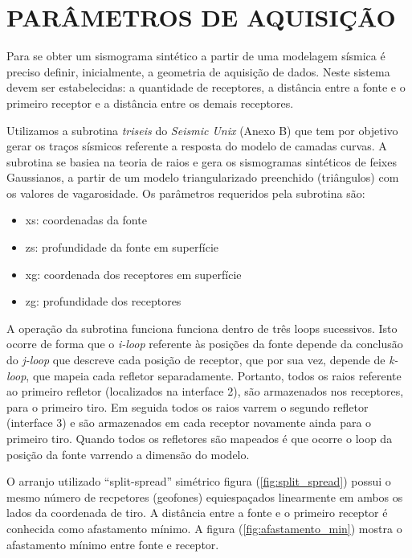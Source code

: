 \section{PARÂMETROS DE AQUISIÇÃO}

Para se obter um sismograma sintético a partir de uma modelagem sísmica é preciso definir, inicialmente, a geometria de aquisição de dados. Neste sistema devem ser estabelecidas: a quantidade de receptores, a distância entre a fonte e o primeiro receptor e a distância entre os demais receptores.

Utilizamos a subrotina \textit{triseis} do \textit{Seismic Unix} (Anexo B) que tem por objetivo gerar os traços sísmicos referente a resposta do modelo de camadas curvas. A subrotina se basiea na teoria de raios e gera os sismogramas sintéticos de feixes Gaussianos, a partir de um modelo triangularizado preenchido (triângulos) com os valores de vagarosidade. Os parâmetros requeridos pela subrotina são:

\begin{itemize}
 \item xs: coordenadas da fonte
 \item zs: profundidade da fonte em superfície
 \item xg: coordenada dos receptores em superfície
 \item zg: profundidade dos receptores
\end{itemize}

A operação da subrotina funciona funciona dentro de três loops sucessivos. Isto ocorre de forma que o \textit{i-loop} referente às posições da fonte depende da conclusão do \textit{j-loop} que descreve cada posição de receptor, que por sua vez, depende de \textit{k-loop}, que mapeia cada refletor separadamente. Portanto, todos os raios referente ao primeiro refletor (localizados na interface 2), são armazenados nos receptores, para o primeiro tiro. Em seguida todos os raios varrem o segundo refletor (interface 3) e são armazenados em cada receptor novamente ainda para o primeiro tiro. Quando todos os refletores são mapeados é que ocorre o loop da posição da fonte varrendo a dimensão do modelo.

O arranjo utilizado ``split-spread'' simétrico figura (\ref{fig:split_spread}) possui o mesmo número de recpetores (geofones) equiespaçados linearmente em ambos os lados da coordenada de tiro. A distância entre a fonte e o primeiro receptor é conhecida como afastamento mínimo. A figura (\ref{fig:afastamento_min}) mostra o afastamento mínimo entre fonte e receptor.

